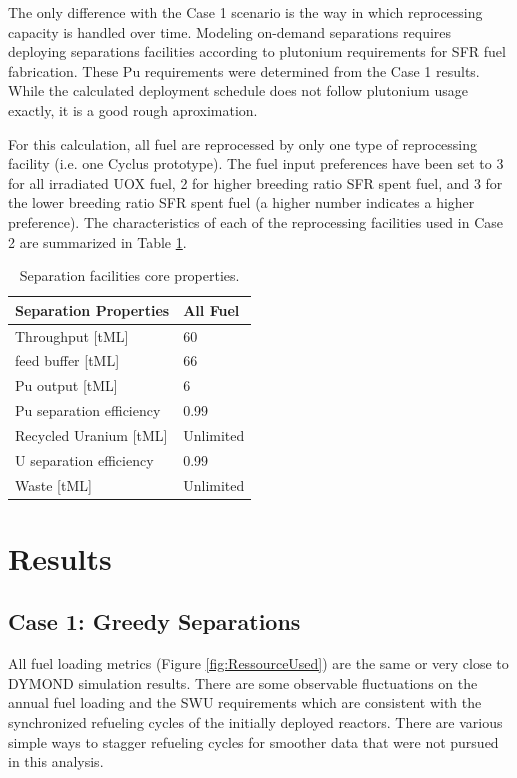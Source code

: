 \documentclass[12pt]{article}
\begin{document}
The only difference with the Case 1 scenario is the way in
which reprocessing capacity is handled over time.  Modeling on-demand
separations requires deploying separations facilities according to plutonium
requirements for SFR fuel fabrication.  These Pu requirements were determined
from the Case 1 results. While the calculated deployment schedule does not
follow plutonium usage exactly, it is a good rough aproximation. 

For this calculation, all fuel are reprocessed by only one type of
reprocessing facility (i.e. one Cyclus prototype). The fuel input preferences
have been set to 3 for all irradiated UOX fuel, 2 for higher breeding ratio
SFR spent fuel, and 3 for the lower breeding ratio SFR spent fuel (a higher
number indicates a higher preference).  The characteristics of each of the
reprocessing facilities used in Case 2 are summarized in Table
\ref{tab:fuelfab_2}.

\begin{table}[h!]
    \centering
    \begin{tabular}{ll}
    \hline
    Separation Properties	&	All Fuel	\\
    \hline
    Throughput [tML]		&	60		\\
    feed buffer [tML]		&	66		\\
    Pu output  [tML]		&	6		\\
    Pu separation efficiency	&	0.99		\\
    Recycled Uranium [tML]	&	Unlimited	\\
    U separation efficiency	&	0.99		\\
    Waste [tML]			&	Unlimited	\\
    \hline
    \end{tabular}
    \caption{Separation facilities core properties.}
    \label{tab:fuelfab_2}
\end{table}

\section{Results}

\subsection{Case 1: Greedy Separations}

All fuel loading metrics (Figure \ref{fig:RessourceUsed}) are the same or very
close to DYMOND simulation results. There are some observable fluctuations on
the annual fuel loading and the SWU requirements which are consistent with the
synchronized refueling cycles of the initially deployed reactors.  There are
various simple ways to stagger refueling cycles for smoother data that were
not pursued in this analysis.
\end{document}
